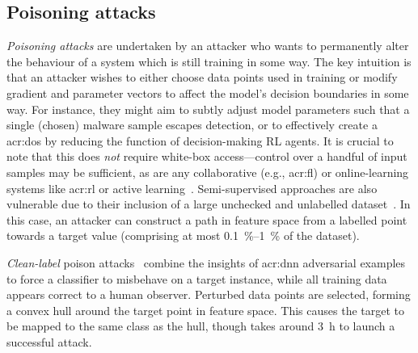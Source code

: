 
\subsection{Poisoning attacks}
\emph{Poisoning attacks} are undertaken by an attacker who wants to permanently alter the behaviour of a system which is still training in some way.
The key intuition is that an attacker wishes to either choose data points used in training or modify gradient and parameter vectors to affect the model's decision boundaries in some way.
For instance, they might aim to subtly adjust model parameters such that a single (chosen) malware sample escapes detection, or to effectively create a \gls{acr:dos} by reducing the function of decision-making RL agents.
It is crucial to note that this does \emph{not} require white-box access---control over a handful of input samples may be sufficient, as are any collaborative (e.g., \gls{acr:fl}) or online-learning systems like \gls{acr:rl} or active learning~\parencite{active-learning-report}.
Semi-supervised approaches are also vulnerable due to their inclusion of a large unchecked and unlabelled dataset~\parencite{DBLP:conf/uss/Carlini21}.
In this case, an attacker can construct a path in feature space from a labelled point towards a target value (comprising at most \qtyrange{0.1}{1}{\percent} of the dataset).

\emph{Clean-label} poison attacks~\parencite{DBLP:journals/corr/abs-2005-00191} combine the insights of \gls{acr:dnn} adversarial examples to force a classifier to misbehave on a target instance, while all training data appears correct to a human observer.
Perturbed data points are selected, forming a convex hull around the target point in feature space.
This causes the target to be mapped to the same class as the hull, though takes around \qty{3}{\hour} to launch a successful attack.

